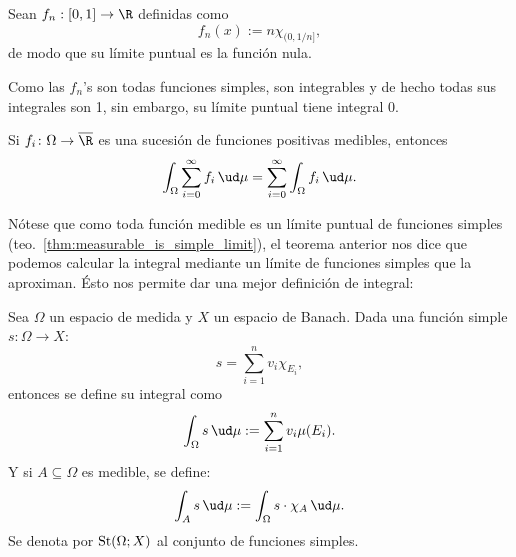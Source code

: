 \begin{ex}
	Sean $f_n:[0,1] \to \R$ definidas como
	$$ f_n(x) := n\chi_{(0, 1/n]}, $$
	de modo que su límite puntual es la función nula.
	\par
	Como las $f_n$'s son todas funciones simples, son integrables y de hecho todas sus integrales son 1, sin embargo, su límite puntual tiene integral 0.
\end{ex}
\begin{cor}
	Si $f_i\colon \Omega\to\overline\R$ es una sucesión de funciones positivas medibles, entonces
	$$ \int_\Omega \sum_{i=0}^\infty f_i \,\ud\mu = \sum_{i=0}^\infty \int_\Omega f_i\,\ud\mu. $$
\end{cor}

Nótese que como toda función medible es un límite puntual de funciones simples (teo.~\ref{thm:measurable_is_simple_limit}), el teorema anterior
nos dice que podemos calcular la integral mediante un límite de funciones simples que la aproximan.
Ésto nos permite dar una mejor definición de integral:
\begin{mydef}
	Sea $\Omega$ un espacio de medida y $X$ un espacio de Banach.
	Dada una función simple $s\colon \Omega \to X$:
	$$ s = \sum_{i=1}^n v_i \chi_{E_i}, $$
	entonces se define su integral como
	$$ \int_\Omega s \, \ud\mu := \sum_{i=1}^n v_i \mu(E_i). $$
	Y si $A \subseteq \Omega$ es medible, se define:
	$$ \int_A s \, \ud\mu := \int_\Omega s\cdot\chi_A \, \ud\mu. $$
	Se denota por $\operatorname{St}(\Omega; X)$ al conjunto de funciones simples.
\end{mydef}

